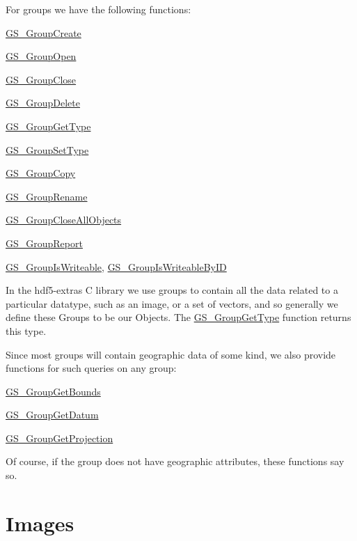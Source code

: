 For groups we have the following functions\+: \begin{DoxyItemize}
\item \hyperlink{hdf5mine_8h_a30baf67ef893fad57fe691473bc26b33}{G\+S\+\_\+\+Group\+Create} \item \hyperlink{hdf5mine_8h_a8df2ff48d2ef0ffa139a42b996581af6}{G\+S\+\_\+\+Group\+Open} \item \hyperlink{hdf5mine_8h_ab3f99f9287304ba4526a9fb04ee734fe}{G\+S\+\_\+\+Group\+Close} \item \hyperlink{hdf5mine_8h_a8176d399de52c42c01724e5ef829df4c}{G\+S\+\_\+\+Group\+Delete} \item \hyperlink{hdf5mine_8h_a87f933403edd6b10b47f8bad5da81fa9}{G\+S\+\_\+\+Group\+Get\+Type} \item \hyperlink{hdf5mine_8h_a56462ec6cf3a1fdc77f63627c3462f5f}{G\+S\+\_\+\+Group\+Set\+Type} \item \hyperlink{hdf5mine_8h_a0a2931cf923ab2f882ea651c9728ac35}{G\+S\+\_\+\+Group\+Copy} \item \hyperlink{hdf5mine_8h_afdd0827596f5db35a15b09ecd8ffb3cd}{G\+S\+\_\+\+Group\+Rename} \item \hyperlink{hdf5mine_8h_a5a95b3e673b85c4f3b5601d411442385}{G\+S\+\_\+\+Group\+Close\+All\+Objects} \item \hyperlink{hdf5mine_8h_aff77b4a7dd8f74adeae18efb6a331382}{G\+S\+\_\+\+Group\+Report} \item \hyperlink{hdf5mine_8h_a7b352a508c40bf8a43033e1ed3c82553}{G\+S\+\_\+\+Group\+Is\+Writeable}, \hyperlink{hdf5mine_8h_ab58e98e5ca13fb36d5ac32e9a55c0821}{G\+S\+\_\+\+Group\+Is\+Writeable\+By\+I\+D}\end{DoxyItemize}
In the hdf5-\/extras C library we use groups to contain all the data related to a particular datatype, such as an image, or a set of vectors, and so generally we define these Groups to be our Objects. The \hyperlink{hdf5mine_8h_a87f933403edd6b10b47f8bad5da81fa9}{G\+S\+\_\+\+Group\+Get\+Type} function returns this type.

Since most groups will contain geographic data of some kind, we also provide functions for such queries on any group\+: \begin{DoxyItemize}
\item \hyperlink{hdf5mine_8h_a9f63935cd0326fb2105c2330d89ed176}{G\+S\+\_\+\+Group\+Get\+Bounds} \item \hyperlink{hdf5mine_8h_a0ca7131d7a70595c1e984e965c91c1fc}{G\+S\+\_\+\+Group\+Get\+Datum} \item \hyperlink{hdf5mine_8h_a1a2d0ab9bb4c96f13b8e04aa1a4d3d63}{G\+S\+\_\+\+Group\+Get\+Projection}\end{DoxyItemize}
Of course, if the group does not have geographic attributes, these functions say so.\hypertarget{hdf_library_object_images}{}\section{Images}\label{hdf_library_object_images}

